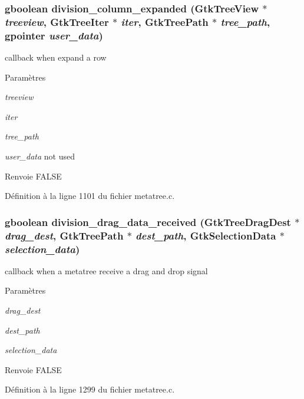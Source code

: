 \subsubsection[{division\_\-column\_\-expanded}]{\setlength{\rightskip}{0pt plus 5cm}gboolean division\_\-column\_\-expanded (GtkTreeView $\ast$ {\em treeview}, \/  GtkTreeIter $\ast$ {\em iter}, \/  GtkTreePath $\ast$ {\em tree\_\-path}, \/  gpointer {\em user\_\-data})}\label{metatree_8c_ad695aea21eec466bbace0cd9a26067f9}
callback when expand a row


\begin{DoxyParams}{Paramètres}
\item[{\em treeview}]\item[{\em iter}]\item[{\em tree\_\-path}]\item[{\em user\_\-data}]not used\end{DoxyParams}
\begin{DoxyReturn}{Renvoie}
FALSE 
\end{DoxyReturn}


Définition à la ligne 1101 du fichier metatree.c.

\subsubsection[{division\_\-drag\_\-data\_\-received}]{\setlength{\rightskip}{0pt plus 5cm}gboolean division\_\-drag\_\-data\_\-received (GtkTreeDragDest $\ast$ {\em drag\_\-dest}, \/  GtkTreePath $\ast$ {\em dest\_\-path}, \/  GtkSelectionData $\ast$ {\em selection\_\-data})}\label{metatree_8c_a77e243b108bde662e9dced05ccef86b8}
callback when a metatree receive a drag and drop signal


\begin{DoxyParams}{Paramètres}
\item[{\em drag\_\-dest}]\item[{\em dest\_\-path}]\item[{\em selection\_\-data}]\end{DoxyParams}
\begin{DoxyReturn}{Renvoie}
FALSE 
\end{DoxyReturn}


Définition à la ligne 1299 du fichier metatree.c.

